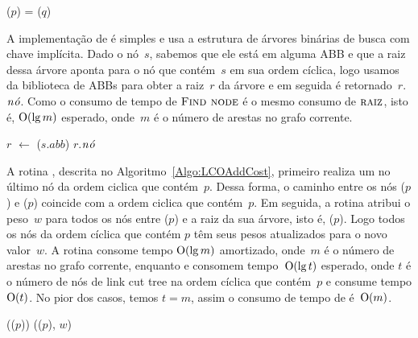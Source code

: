 \begin{algorithm}[htb]
\caption{\LCOConnected($p$, $q$)}
\label{Algo:LCOConnected}
\begin{algorithmic}[1]
\State \Return \linkcutRoot($p$) = \linkcutRoot($q$)
\end{algorithmic}
\end{algorithm}

A implementação de \LCOFindNode{} é simples e usa a estrutura de árvores binárias de busca com chave implícita.
Dado o nó~$s$, sabemos que ele está em alguma ABB e que a raiz dessa árvore aponta para o nó que contém~$s$ em sua ordem cíclica,
logo usamos \treapGetRoot{} da biblioteca de ABBs para obter a raiz~$r$ da árvore e em seguida é retornado~$r$.$\mathit{n\acute{o}}$.
Como o consumo de tempo de $\text{\scshape Find node}$ é o mesmo consumo de $\text{\scshape raiz}$, isto é, $\mathrm{O}(\lg m)$ esperado, onde~$m$ é o número de arestas no grafo corrente.

\begin{algorithm}[htb]
\caption{\LCOFindNode($s$)}
\label{Algo:LCOFindNode}
\begin{algorithmic}[1]
\State $r$ $\gets$ \treapGetRoot($s.abb$)
\State \Return $r$.$\mathit{n\acute{o}}$
\end{algorithmic}
\end{algorithm}

A rotina \LCOAddCost{}, descrita no Algoritmo~\ref{Algo:LCOAddCost}, primeiro realiza um \linkcutEvert{} no último nó da ordem ciclica que contém~$p$.
Dessa forma, o caminho entre os nós \treapFirst($p$) e \treapLast($p$) coincide com a ordem ciclica que contém~$p$.
Em seguida, a rotina \linkcutWeight{} atribui o peso~$w$ para todos os nós entre \treapFirst($p$) e a raiz da sua árvore, isto é, \treapLast($p$).
Logo todos os nós da ordem cíclica que contém $p$ têm seus pesos atualizados para o novo valor~$w$.
A rotina \linkcutEvert{} consome tempo $\mathrm{O}(\lg m)$ amortizado, onde~$m$ é o número de arestas no grafo corrente, enquanto \treapLast{} e \treapFirst{} consomem tempo~$\mathrm{O}(\lg t)$ esperado, onde $t$ é o número de nós de link cut tree na ordem cíclica que contém~$p$ e \linkcutWeight{} consume tempo $\mathrm{O}(t)$.
No pior dos casos, temos $t=m$, assim o consumo de tempo de \LCOAddCost{} é~$\mathrm{O}(m)$.

\begin{algorithm}[htb]
\caption{\LCOAddCost($p$, $w$)}
\label{Algo:LCOAddCost}
\begin{algorithmic}[1]
\State \linkcutEvert(\treapLast($p$))
\State \linkcutWeight(\treapFirst($p$), $w$)
\end{algorithmic}
\end{algorithm}

